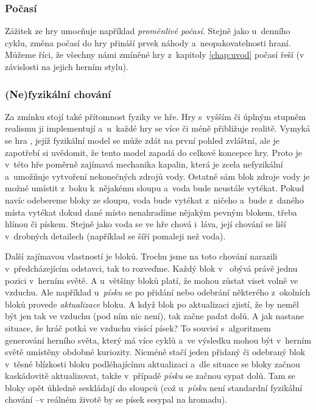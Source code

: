 \subsubsection{Počasí}
Zážitek ze hry umocňuje například \textit{proměnlivé počasí}. Stejně jako u~denního cyklu, změna počasí do hry přináší prvek náhody a~neopakovatelnosti hraní. Můžeme říci, že všechny námi zmíněné hry z~kapitoly \ref{chap:uvod} počasí řeší (v závislosti na jejich herním stylu). 

\subsubsection{(Ne)fyzikální chování}

Za zmínku stojí také přítomnost fyziky ve hře. Hry s~vyšším či úplným stupněm realismu ji implementují a~u~každé hry se více či méně přibližuje realitě. Vymyká se hra \MC{}, jejíž fyzikální model se může zdát na první pohled zvláštní, ale je zapotřebí si uvědomit, že tento model zapadá do celkové koncepce hry. Proto je v~této hře poměrně zajímavá mechanika kapalin, která je zcela nefyzikální a~umožňuje vytvoření nekonečných zdrojů vody. Ostatně sám blok zdroje vody je možné umístit z~boku k~nějakému sloupu a~voda bude neustále vytékat. Pokud navíc odebereme bloky ze sloupu, voda bude vytékat z~ničeho a~bude z~daného místa vytékat dokud dané místo nenahradíme nějakým pevným blokem, třeba hlínou či pískem. Stejně jako voda se ve hře chová i~láva, její chování se liší v~drobných detailech (například se šíří pomaleji než voda).

Další zajímavou vlastností je  bloků. Trochu jsme na toto chování narazili v~předcházejícím odstavci, tak to rozveďme. Každý blok v~ obývá právě jednu pozici v~herním světě. A u~většiny bloků platí, že mohou zůstat viset volně ve vzduchu. Ale například u~\textit{písku} se po přidání nebo odebrání některého z~okolních bloků provede \textit{aktualizace} bloku. A když blok po aktualizaci zjistí, že by neměl být jen tak ve vzduchu (pod ním nic není), tak začne padat dolů. A jak nastane situace, že hráč potká ve vzduchu visící písek? To souvisí s~algoritmem generování herního světa, který má více cyklů a~ve výsledku mohou být v~herním světě umístěny obdobné kuriozity. Nicméně stačí jeden přidaný či odebraný blok v~těsné blízkosti bloku podléhajícímu aktualizaci a~dle situace se bloky začnou kaskádovitě aktualizovat, takže v~případě \textit{písku} se začnou sypat dolů. Tam se bloky opět úhledně seskládají do sloupců (což u~\textit{písku} není standardní fyzikální chování --v reálném životě by se písek sesypal na hromadu).


